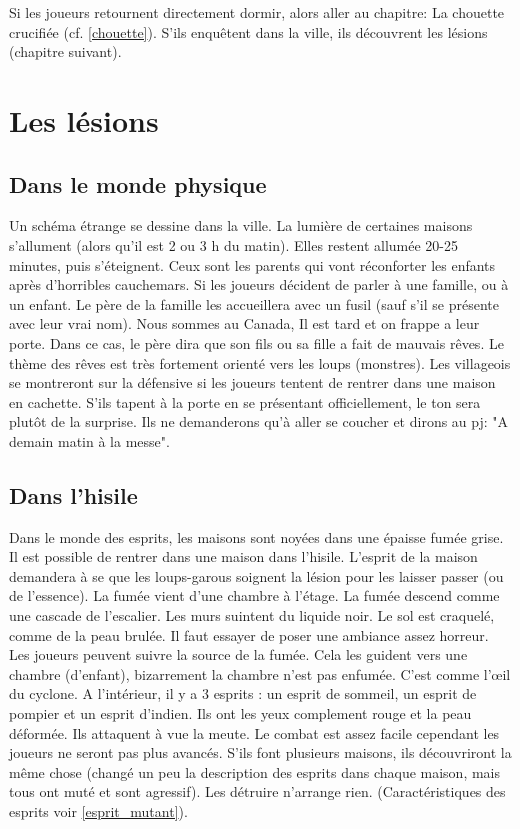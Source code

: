 \documentclass[oneside,12pt]{book}
\begin{document}
\begin{flushleft}
Si les joueurs retournent directement dormir, alors aller au chapitre: La chouette crucifiée (cf. \ref{chouette}). S'ils enquêtent dans la ville, ils découvrent les lésions (chapitre suivant).


\section{Les lésions}
\subsection{Dans le monde physique}
\label{physique_enquete}
Un schéma étrange se dessine dans la ville. La lumière de certaines maisons s'allument (alors qu'il est 2 ou 3 h du matin). Elles restent allumée 20-25 minutes, puis s’éteignent. 
Ceux sont les parents qui vont réconforter les enfants après d'horribles cauchemars.
Si les joueurs décident de parler à une famille, ou à un enfant. Le père de la famille les accueillera avec un fusil (sauf s'il se présente avec leur vrai nom). Nous sommes au Canada, Il est tard et on frappe a leur porte. Dans ce cas, le père dira que son fils ou sa fille a fait de mauvais rêves. Le thème des rêves est très fortement orienté vers les loups (monstres). Les villageois se montreront sur la défensive si les joueurs tentent de rentrer dans une maison en cachette. S'ils tapent à la porte en se présentant officiellement, le ton sera plutôt de la surprise. Ils ne demanderons qu'à aller se coucher et dirons au pj: "A demain matin à la messe".

\subsection{Dans l'hisile}
\label{hisile_enquete}
Dans le monde des esprits, les maisons sont noyées dans une épaisse fumée grise.
Il est possible de rentrer dans une maison dans l'hisile. L'esprit de la maison demandera à se que les loups-garous soignent la lésion pour les laisser passer (ou de l'essence). La fumée vient d'une chambre à l'étage. La fumée descend comme une cascade de l'escalier. Les murs suintent du liquide noir. Le sol est craquelé, comme de la peau brulée. Il faut essayer de poser une ambiance assez horreur. Les joueurs peuvent suivre la source de la fumée. Cela les guident vers une chambre (d'enfant), bizarrement la chambre n'est pas enfumée. C'est comme l’œil du cyclone. A l'intérieur, il y a 3 esprits : un esprit de sommeil, un esprit de pompier et un esprit d'indien. Ils ont les yeux complement rouge et la peau déformée. Ils attaquent à vue la meute. Le combat est assez facile cependant les joueurs ne seront pas plus avancés. S'ils font plusieurs maisons, ils découvriront la même chose (changé un peu la description des esprits dans chaque maison, mais tous ont muté et sont agressif). Les détruire n'arrange rien.  (Caractéristiques des esprits voir \ref{esprit_mutant}). 


\end{flushleft}
\end{document}
